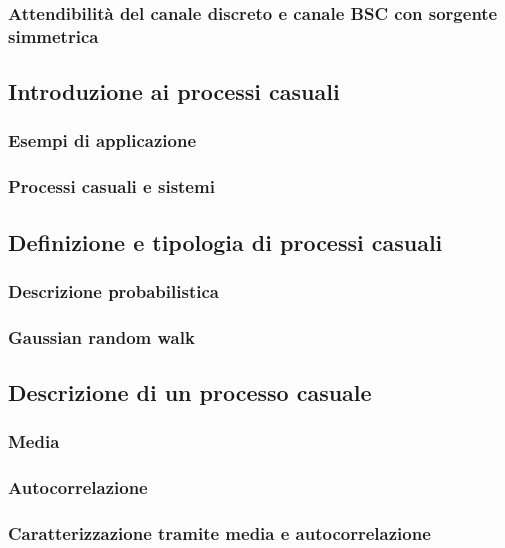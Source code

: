 \documentclass[../main.tex]{subfiles}
\begin{document}
\subsubsection{Attendibilità del canale discreto e canale BSC con sorgente simmetrica}

\subsection{Introduzione ai processi casuali}

\subsubsection{Esempi di applicazione}
\subsubsection{Processi casuali e sistemi}		

\subsection{Definizione e tipologia di processi casuali}

\newpage


\subsubsection{Descrizione probabilistica}

\subsubsection{Gaussian random walk}

\subsection{Descrizione di un processo casuale}

\subsubsection{Media}

\subsubsection{Autocorrelazione}

\subsubsection{Caratterizzazione tramite media e autocorrelazione}
\end{document}
